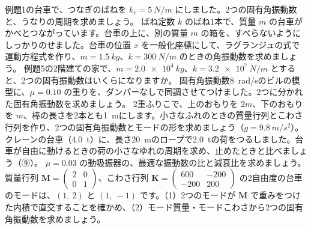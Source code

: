 \bkendproblems
{}
\bkproblem 例題1の台車で、つなぎのばねを $k_{\mathrm c}=\qty{5}{N/m}$ にしました。2つの固有角振動数と、うなりの周期を求めましょう。
\bkproblem ばね定数 $k$ のばね1本で、質量 $m$ の台車がかべとつながっています。台車の上に、別の質量 $m$ の箱を、すべらないようにしっかりのせました。台車の位置 $x$ を一般化座標にして、ラグランジュの式で運動方程式を作り、$m=\qty{1.5}{kg}$、$k=\qty{300}{N/m}$ のときの角振動数を求めましょう。
\bkproblem 例題5の2階建ての家で、$m=\qty{2.0e4}{kg}$、$k=\qty{3.2e7}{N/m}$ とすると、2つの固有振動数はいくらになりますか。
\bkproblem 固有角振動数\qty{8}{rad/s}のビルの模型に、$\mu=0.10$ の重りを、ダンパーなしで同調させてつけました。2つに分かれた固有角振動数を求めましょう。
\bkproblem 2重ふりこで、上のおもりを $2m$、下のおもりを $m$、棒の長さを2本とも\qty{1}{m}にします。小さなふれのときの質量行列とこわさ行列を作り、2つの固有角振動数とモードの形を求めましょう（$g=\qty{9.8}{m/s^2}$）。
\bkproblem クレーンの台車（\qty{4.0}{t}）に、長さ\qty{20}{m}のロープで\qty{2.0}{t}の荷をつるしました。台車が自由に動けるときの荷の小さなゆれの周期を求め、止めたときと比べましょう（⑨）。
\bkproblem $\mu=0.03$ の動吸振器の、最適な振動数の比と減衰比を求めましょう。
\bkproblem 質量行列 $\mathbf M=\begin{pmatrix}2&0\\0&1\end{pmatrix}$、こわさ行列 $\mathbf K=\begin{pmatrix}600&-200\\-200&200\end{pmatrix}$ の2自由度の台車のモードは、$(1,\ 2)$ と $(1,\ -1)$ です。（1）2つのモードが $\mathbf M$ で重みをつけた内積で直交することを確かめ、（2）モード質量・モードこわさから2つの固有角振動数を求めましょう。
